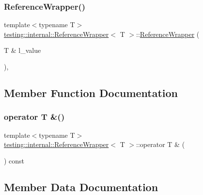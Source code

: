 \subsubsection{\texorpdfstring{ReferenceWrapper()}{ReferenceWrapper()}}
{\footnotesize\ttfamily template$<$typename T$>$ \\
\mbox{\hyperlink{classtesting_1_1internal_1_1_reference_wrapper}{testing\+::internal\+::\+Reference\+Wrapper}}$<$ T $>$\+::\mbox{\hyperlink{classtesting_1_1internal_1_1_reference_wrapper}{Reference\+Wrapper}} (\begin{DoxyParamCaption}\item[{T \&}]{l\+\_\+value }\end{DoxyParamCaption})\hspace{0.3cm}{\ttfamily [inline]}, {\ttfamily [explicit]}}



\subsection{Member Function Documentation}
\mbox{\label{classtesting_1_1internal_1_1_reference_wrapper_a90ff0f93425244ca7f9cbd1d46017e80}} 
\subsubsection{\texorpdfstring{operator T \&()}{operator T \&()}}
{\footnotesize\ttfamily template$<$typename T$>$ \\
\mbox{\hyperlink{classtesting_1_1internal_1_1_reference_wrapper}{testing\+::internal\+::\+Reference\+Wrapper}}$<$ T $>$\+::operator T \& (\begin{DoxyParamCaption}{ }\end{DoxyParamCaption}) const\hspace{0.3cm}{\ttfamily [inline]}}



\subsection{Member Data Documentation}
\mbox{\label{classtesting_1_1internal_1_1_reference_wrapper_abc085b4a0cdea43258c297c6989fdc7d}} 
